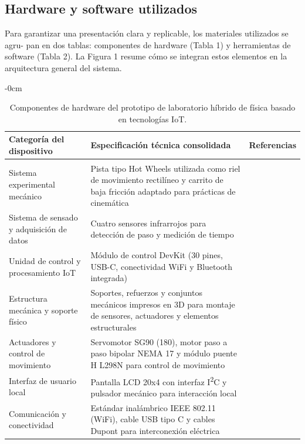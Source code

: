 \documentclass[journal,article,submit,pdftex]{Definitions/mdpi}
\begin{document}
\subsection{Hardware y software utilizados}

Para garantizar una presentaci\'on clara y replicable, los materiales utilizados se agru- pan en dos tablas: componentes de hardware (Tabla 1) y herramientas de software (Tabla 2). La Figura 1 resume c\'omo se integran estos elementos en la arquitectura general del sistema.

\begin{table}[H]
	\caption{Componentes de hardware del prototipo de laboratorio h\'ibrido de f\'isica basado en tecnolog\'ias IoT.\label{tab:hardware}}
	\small
	\begin{adjustwidth}{-\extralength}{0cm}
		\renewcommand{\arraystretch}{1.5}
		\renewcommand{\tabularxcolumn}[1]{m{#1}}
		\begin{tabularx}{\fulllength}{>{\raggedright\arraybackslash}m{4.5cm}Xc}
			\toprule
			\textbf{Categor\'ia del dispositivo} & \textbf{Especificaci\'on t\'ecnica consolidada} & \textbf{Referencias} \\
			\midrule
			Sistema experimental mec\'anico & Pista tipo Hot Wheels\textsuperscript{\textregistered} utilizada como riel de movimiento rectil\'ineo y carrito de baja fricci\'on adaptado para pr\'acticas de cinem\'atica & \cite{r18,r19} \\
			Sistema de sensado y adquisici\'on de datos & Cuatro sensores infrarrojos para detecci\'on de paso y medici\'on de tiempo & \cite{r20} \\
			Unidad de control y procesamiento IoT & Módulo de control DevKit (30 pines, USB-C, conectividad WiFi y Bluetooth integrada) & \cite{r21,r53} \\
			Estructura mec\'anica y soporte f\'isico & Soportes, refuerzos y conjuntos mec\'anicos impresos en 3D para montaje de sensores, actuadores y elementos estructurales & \cite{r22,r23,r24,r25} \\
			Actuadores y control de movimiento & Servomotor SG90 (180\textdegree), motor paso a paso bipolar NEMA 17 y m\'odulo puente H L298N para control de movimiento & \cite{r26,r27,r28} \\
			Interfaz de usuario local & Pantalla LCD 20x4 con interfaz I\textsuperscript{2}C y pulsador mec\'anico para interacci\'on local & \cite{r29,r30} \\
			Comunicaci\'on y conectividad & Est\'andar inal\'ambrico IEEE 802.11 (WiFi), cable USB tipo C y cables Dupont para interconexi\'on el\'ectrica & \cite{r31,r32,r33} \\

\end{tabularx}
\end{adjustwidth}
\end{table}
\end{document}
